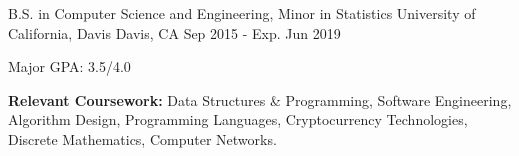 

\begin{cventries}

  \cventry
    {B.S. in Computer Science and Engineering, Minor in Statistics} %
    {University of California, Davis} %
    {Davis, CA} %
    {Sep 2015 - Exp. Jun 2019} %
    {
      \begin{cvitems} %
        \item {Major GPA: 3.5/4.0}
      \end{cvitems}
    }

\end{cventries}

\begin{cvparagraph}
  \textbf{Relevant Coursework: } Data Structures \& Programming, Software Engineering, Algorithm Design, Programming Languages, Cryptocurrency Technologies, Discrete Mathematics, Computer Networks.

\end{cvparagraph}
